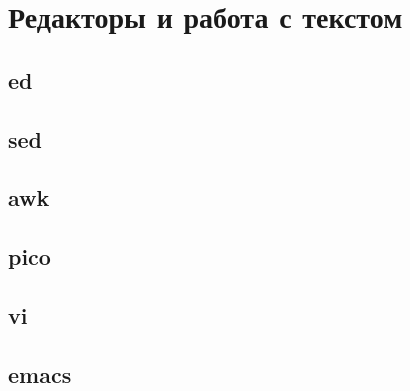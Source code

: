 \section{Редакторы и работа с текстом}
\subsection{ed}
\subsection{sed}
\subsection{awk}
\subsection{pico}
\subsection{vi}
\subsection{emacs}
\newpage
